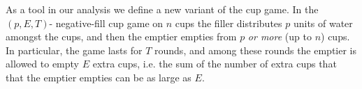 

As a tool in our analysis we define a new variant of the cup
game. In the $(p, E, T)$- negative-fill cup
game on $n$ cups the filler distributes $p$ units of water
amongst the cups, and then the emptier empties from $p$
\textit{or more} (up to $n$) cups. In particular, the
game lasts for $T$ rounds, and among these rounds the emptier is
allowed to empty $E$ extra cups, i.e. the sum of the number of
extra cups that that the emptier empties can be as large as $E$.

